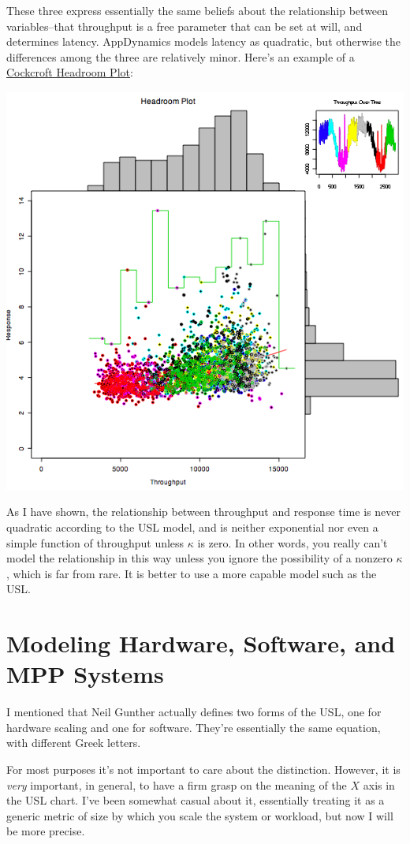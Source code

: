 \documentclass{vivid_layout}
\begin{document}
These three express essentially the same beliefs about the relationship between
variables--that throughput is a free parameter that can be set at will, and
determines latency.  AppDynamics models latency as quadratic, but otherwise
the differences among the three are relatively minor. Here's an example of a
\href{http://perfcap.blogspot.nl/2008/07/enhanced-headroom-plot-in-r.html}{Cockcroft
Headroom Plot}:
\begin{center}
\includegraphics[width=.60\linewidth]{scalability/chpblog3}
\end{center}

As I have shown, the relationship between throughput and response time is never
quadratic according to the USL model, and is neither exponential nor even a
simple function of throughput unless $\kappa$ is zero.  In other words, you
really can't model the relationship in this way unless you ignore the
possibility of a nonzero $\kappa$, which is far from rare. It is better to use a
more capable model such as the USL.

\newpage
\section{Modeling Hardware, Software, and MPP Systems}

I mentioned that Neil Gunther actually defines two forms of the USL, one for
hardware scaling and one for software. They're essentially the same equation,
with different Greek letters.

For most purposes it's not important to care about the distinction. However, it
is {\itshape very} important, in general, to have a firm grasp on the meaning of
the $X$ axis in the USL chart. I've been somewhat casual about it, essentially
treating it as a generic metric of size by which you scale the system or
workload, but now I will be more precise.
\end{document}
